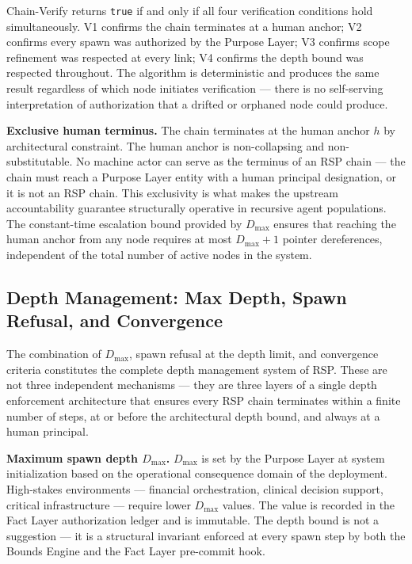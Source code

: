 Chain-Verify returns \texttt{true} if and only if all four verification conditions hold simultaneously. V1 confirms the chain terminates at a human anchor; V2 confirms every spawn was authorized by the Purpose Layer; V3 confirms scope refinement was respected at every link; V4 confirms the depth bound was respected throughout. The algorithm is deterministic and produces the same result regardless of which node initiates verification --- there is no self-serving interpretation of authorization that a drifted or orphaned node could produce.

\medskip
\noindent\textbf{Exclusive human terminus.} The chain terminates at the human anchor $h$ by architectural constraint. The human anchor is non-collapsing and non-substitutable. No machine actor can serve as the terminus of an RSP chain --- the chain must reach a Purpose Layer entity with a human principal designation, or it is not an RSP chain. This exclusivity is what makes the \bxthree{} upstream accountability guarantee structurally operative in recursive agent populations. The constant-time escalation bound provided by $D_{\max}$ ensures that reaching the human anchor from any node requires at most $D_{\max} + 1$ pointer dereferences, independent of the total number of active nodes in the system.

\subsection{Depth Management: Max Depth, Spawn Refusal, and Convergence}
\label{sec:rs-depth-management}

The combination of $D_{\max}$, spawn refusal at the depth limit, and convergence criteria constitutes the complete depth management system of RSP. These are not three independent mechanisms --- they are three layers of a single depth enforcement architecture that ensures every RSP chain terminates within a finite number of steps, at or before the architectural depth bound, and always at a human principal.

\medskip
\noindent\textbf{Maximum spawn depth $D_{\max}$.} $D_{\max}$ is set by the Purpose Layer at system initialization based on the operational consequence domain of the deployment. High-stakes environments --- financial orchestration, clinical decision support, critical infrastructure --- require lower $D_{\max}$ values. The value is recorded in the Fact Layer authorization ledger and is immutable. The depth bound is not a suggestion --- it is a structural invariant enforced at every spawn step by both the Bounds Engine and the Fact Layer pre-commit hook.

